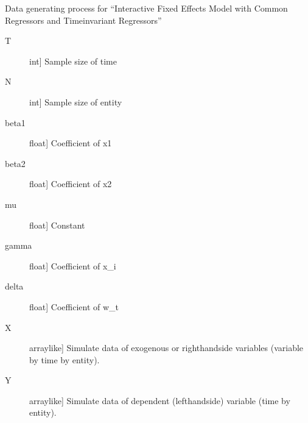 \documentclass[a4paper,11pt,english]{sphinxmanual}
\begin{document}
\begin{fulllineitems}
\label{\detokenize{analysis:src.analysis.monte_carlo_dgp.dgp_interactive_fixed_effects_model_with_common_and_time_invariant}}
\sphinxAtStartPar
Data generating process for “Interactive Fixed Effects Model with Common
Regressors and Time\sphinxhyphen{}invariant Regressors”
\begin{description}
\item[{T}] \leavevmode{[}int{]}
\sphinxAtStartPar
Sample size of time

\item[{N}] \leavevmode{[}int{]}
\sphinxAtStartPar
Sample size of entity

\item[{beta1}] \leavevmode{[}float{]}
\sphinxAtStartPar
Coefficient of x1

\item[{beta2}] \leavevmode{[}float{]}
\sphinxAtStartPar
Coefficient of x2

\item[{mu}] \leavevmode{[}float{]}
\sphinxAtStartPar
Constant

\item[{gamma}] \leavevmode{[}float{]}
\sphinxAtStartPar
Coefficient of x\_i

\item[{delta}] \leavevmode{[}float{]}
\sphinxAtStartPar
Coefficient of w\_t

\end{description}
\begin{description}
\item[{X}] \leavevmode{[}array\sphinxhyphen{}like{]}
\sphinxAtStartPar
Simulate data of exogenous or right\sphinxhyphen{}hand\sphinxhyphen{}side variables (variable by time by
entity).

\item[{Y}] \leavevmode{[}array\sphinxhyphen{}like{]}
\sphinxAtStartPar
Simulate data of dependent (left\sphinxhyphen{}hand\sphinxhyphen{}side) variable (time by entity).


\end{description}
\end{fulllineitems}
\end{document}
